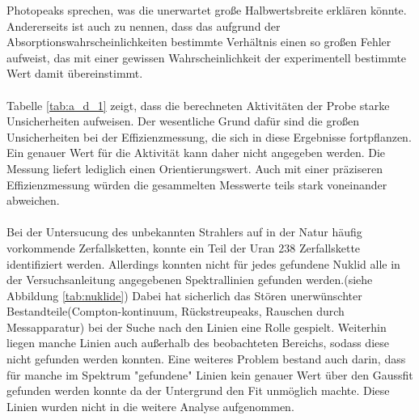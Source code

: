 Photopeaks sprechen, was die unerwartet große Halbwertsbreite erklären könnte. Andererseits ist auch zu nennen, dass das aufgrund der Absorptionswahrscheinlichkeiten bestimmte
Verhältnis einen so großen Fehler aufweist, das mit einer gewissen Wahrscheinlichkeit der experimentell bestimmte Wert damit übereinstimmt.\\ \\
Tabelle \ref{tab:a_d_1} zeigt, dass die berechneten Aktivitäten der Probe starke Unsicherheiten aufweisen.
Der wesentliche Grund dafür sind die großen Unsicherheiten bei der Effizienzmessung, die sich in diese Ergebnisse fortpflanzen.
Ein genauer Wert für die Aktivität kann daher nicht angegeben werden.
Die Messung liefert lediglich einen Orientierungswert.
Auch mit einer präziseren Effizienzmessung würden die gesammelten Messwerte teils stark voneinander abweichen.\\ \\
Bei der Untersucung des unbekannten Strahlers auf in der Natur häufig vorkommende Zerfallsketten, konnte
ein Teil der Uran 238 Zerfallskette identifiziert werden. Allerdings konnten nicht für jedes gefundene
Nuklid alle in der Versuchsanleitung angegebenen Spektrallinien gefunden werden.(siehe Abbildung \ref{tab:nuklide})
Dabei hat sicherlich das Stören unerwünschter Bestandteile(Compton-kontinuum, Rückstreupeaks, Rauschen durch Messapparatur) bei der Suche nach den Linien eine Rolle gespielt.
Weiterhin liegen manche Linien auch außerhalb des beobachteten Bereichs, sodass diese nicht gefunden werden konnten.
Eine weiteres Problem bestand auch darin, dass für manche im Spektrum "gefundene" Linien kein genauer
Wert über den Gaussfit gefunden werden konnte da der Untergrund den Fit unmöglich machte. Diese Linien wurden
nicht in die weitere Analyse aufgenommen.
